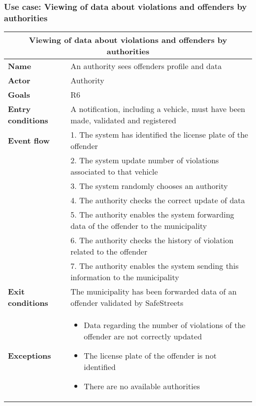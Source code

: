 \subsubsection{Use case: Viewing of data about violations and offenders by authorities}
\begin{center}
    \begin{tabular}{|p{3cm}|p{7cm}|}
        \multicolumn{2}{c}{\textbf{Viewing of data about violations and offenders by authorities}} \\
        \hline
        \textbf{Name} & An authority sees offenders profile and data \\
        \hline
        \textbf{Actor} & Authority \\
        \hline
        \textbf{Goals} & R6 \\
        \hline
        \textbf{Entry conditions} & A notification, including a vehicle, must have been made, validated and registered \\
        \hline
        \textbf{Event flow} & 1. The system has identified the license plate of the offender \\ 
        & 2. The system update number of violations associated to that vehicle \\ 
        & 3. The system randomly chooses an authority \\
        & 4. The authority checks the correct update of data \\
        & 5. The authority enables the system forwarding data of the offender to the municipality \\ 
        & 6. The authority checks the history of violation related to the offender \\ 
        & 7. The authority enables the system sending this information to the municipality \\
        \hline
        \textbf{Exit conditions} & The municipality has been forwarded data of an offender validated by SafeStreets \\
        \hline
        \textbf{Exceptions}
        & \begin{itemize}
            \item Data regarding the number of violations of the offender are not correctly updated
            \item The license plate of the offender is not identified
            \item There are no available authorities 
        \end{itemize} \\
        \hline
    \end{tabular}
\end{center}

